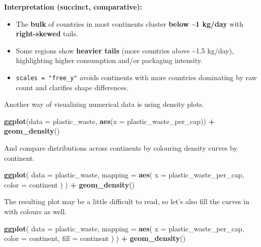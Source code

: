 \documentclass[
]{article}
\newenvironment{Shaded}{\begin{snugshade}}{\end{snugshade}}
\newcommand{\AttributeTok}[1]{\textcolor[rgb]{0.13,0.29,0.53}{#1}}
\newcommand{\FunctionTok}[1]{\textcolor[rgb]{0.13,0.29,0.53}{\textbf{#1}}}
\newcommand{\NormalTok}[1]{#1}
\newcommand{\SpecialCharTok}[1]{\textcolor[rgb]{0.81,0.36,0.00}{\textbf{#1}}}
\providecommand{\tightlist}{%
  \setlength{\itemsep}{0pt}\setlength{\parskip}{0pt}}
\begin{document}
\textbf{Interpretation (succinct, comparative):}

\begin{itemize}
\tightlist
\item
  The \textbf{bulk} of countries in most continents cluster
  \textbf{below \textasciitilde1 kg/day} with \textbf{right-skewed}
  tails.
\item
  Some regions show \textbf{heavier tails} (more countries above
  \textasciitilde1.5 kg/day), highlighting higher consumption and/or
  packaging intensity.
\item
  \texttt{scales\ =\ "free\_y"} avoids continents with more countries
  dominating by raw count and clarifies shape differences.
\end{itemize}

Another way of visualizing numerical data is using density plots.

\begin{Shaded}
\begin{Highlighting}[]
\FunctionTok{ggplot}\NormalTok{(}\AttributeTok{data =}\NormalTok{ plastic\_waste, }\FunctionTok{aes}\NormalTok{(}\AttributeTok{x =}\NormalTok{ plastic\_waste\_per\_cap)) }\SpecialCharTok{+}
  \FunctionTok{geom\_density}\NormalTok{()}
\end{Highlighting}
\end{Shaded}

And compare distributions across continents by colouring density curves
by continent.

\begin{Shaded}
\begin{Highlighting}[]
\FunctionTok{ggplot}\NormalTok{(}
  \AttributeTok{data =}\NormalTok{ plastic\_waste,}
  \AttributeTok{mapping =} \FunctionTok{aes}\NormalTok{(}
    \AttributeTok{x =}\NormalTok{ plastic\_waste\_per\_cap,}
    \AttributeTok{color =}\NormalTok{ continent}
\NormalTok{  )}
\NormalTok{) }\SpecialCharTok{+}
  \FunctionTok{geom\_density}\NormalTok{()}
\end{Highlighting}
\end{Shaded}

The resulting plot may be a little difficult to read, so let's also fill
the curves in with colours as well.

\begin{Shaded}
\begin{Highlighting}[]
\FunctionTok{ggplot}\NormalTok{(}
  \AttributeTok{data =}\NormalTok{ plastic\_waste,}
  \AttributeTok{mapping =} \FunctionTok{aes}\NormalTok{(}
    \AttributeTok{x =}\NormalTok{ plastic\_waste\_per\_cap,}
    \AttributeTok{color =}\NormalTok{ continent,}
    \AttributeTok{fill =}\NormalTok{ continent}
\NormalTok{  )}
\NormalTok{) }\SpecialCharTok{+}
  \FunctionTok{geom\_density}\NormalTok{()}
\end{Highlighting}
\end{Shaded}
\end{document}
